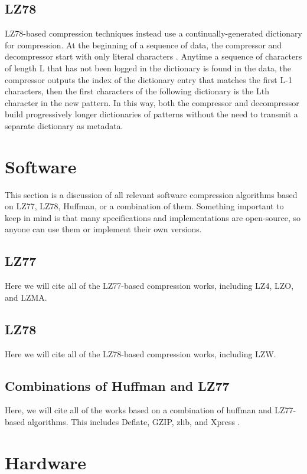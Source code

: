 \documentclass[doublespace,draft,nopageskip]{VTthesis} %
\begin{document}
\subsection{LZ78}\label{ss:lz78}
LZ78-based compression techniques instead use a continually-generated dictionary for compression. At the beginning of a sequence of data, the compressor and decompressor start with only literal characters \cite{lz78}. Anytime a sequence of characters of length L that has not been logged in the dictionary is found in the data, the compressor outputs the index of the dictionary entry that matches the first L-1 characters, then the first characters of the following dictionary is the Lth character in the new pattern. In this way, both the compressor and decompressor build progressively longer dictionaries of patterns without the need to transmit a separate dictionary as metadata.

\section{Software}\label{se:software}
This section is a discussion of all relevant software compression algorithms based on LZ77, LZ78, Huffman, or a combination of them. Something important to keep in mind is that many specifications and implementations are open-source, so anyone can use them or implement their own versions.

\subsection{LZ77}\label{ss:lz77_software}
Here we will cite all of the LZ77-based compression works, including LZ4, LZO, and LZMA.

\subsection{LZ78}\label{ss:lz48_software}
Here we will cite all of the LZ78-based compression works, including LZW.

\subsection{Combinations of Huffman and LZ77}\label{ss:combinations_of_huffman_and_lz77}
Here, we will cite all of the works based on a combination of huffman and LZ77-based algorithms. This includes Deflate, GZIP, zlib, and Xpress \cite{deflate, gzip, zlib, xpress}.

\section{Hardware}\label{se:hardware}
\end{document}
